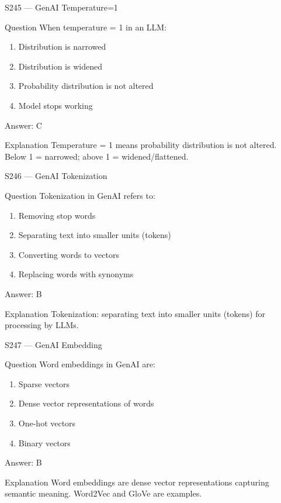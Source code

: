 \documentclass[aspectratio=169,8pt]{beamer}
\begin{document}
\begin{frame}{S245 --- GenAI Temperature=1}
	\begin{block}{Question}
		When temperature = 1 in an LLM:
		\begin{enumerate}
			\item Distribution is narrowed
			\item Distribution is widened
			\item Probability distribution is not altered
			\item Model stops working
		\end{enumerate}
	\end{block}
	\begin{exampleblock}{Answer: C}\end{exampleblock}
	\begin{block}{Explanation}
		Temperature = 1 means probability distribution is not altered. Below 1 = narrowed; above 1 = widened/flattened.
	\end{block}
\end{frame}

\begin{frame}{S246 --- GenAI Tokenization}
	\begin{block}{Question}
		Tokenization in GenAI refers to:
		\begin{enumerate}
			\item Removing stop words
			\item Separating text into smaller units (tokens)
			\item Converting words to vectors
			\item Replacing words with synonyms
		\end{enumerate}
	\end{block}
	\begin{exampleblock}{Answer: B}\end{exampleblock}
	\begin{block}{Explanation}
		Tokenization: separating text into smaller units (tokens) for processing by LLMs.
	\end{block}
\end{frame}

\begin{frame}{S247 --- GenAI Embedding}
	\begin{block}{Question}
		Word embeddings in GenAI are:
		\begin{enumerate}
			\item Sparse vectors
			\item Dense vector representations of words
			\item One-hot vectors
			\item Binary vectors
		\end{enumerate}
	\end{block}
	\begin{exampleblock}{Answer: B}\end{exampleblock}
	\begin{block}{Explanation}
		Word embeddings are dense vector representations capturing semantic meaning. Word2Vec and GloVe are examples.
	\end{block}
\end{frame}
\end{document}
